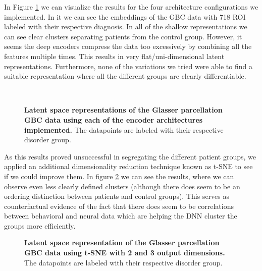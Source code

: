\documentclass[fleqn,moreauthors,10pt]{ds_report}
\begin{document}
In Figure \ref{fig:latent_space_nn} we can visualize the results for the four architecture configurations we implemented. In it we can see the embeddings of the GBC data with 718 ROI labeled with their respective diagnosis. In all of the shallow representations we can see clear clusters separating patients from the control group. However, it seems the deep encoders compress the data too excessively by combining all the features multiple times. This results in very flat/uni-dimensional latent representations. Furthermore, none of the variations we tried were able to find a suitable representation where all the different groups are clearly differentiable.

\begin{figure}[h!]
    \centering
     \\
    \caption{\textbf{Latent space representations of the Glasser parcellation GBC data using each of the encoder architectures implemented.} The datapoints are labeled with their respective disorder group.}
    \label{fig:latent_space_nn}
\end{figure}

As this results proved unsuccessful in segregating the different patient groups, we applied an additional dimensionality reduction technique known as t-SNE to see if we could improve them. In figure \ref{fig:tsne} we can see the results, where we can observe even less clearly defined clusters (although there does seem to be an ordering distinction between patients and control groups). This serves as counterfactual evidence of the fact that there does seem to be correlations between behavioral and neural data which are helping the DNN cluster the groups more efficiently.

\begin{figure}[h!]
    \centering
    \caption{\textbf{Latent space representation of the Glasser parcellation GBC data using t-SNE with 2 and 3 output dimensions.} The datapoints are labeled with their respective disorder group.}
    \label{fig:tsne}
\end{figure}
\end{document}
